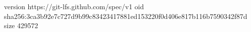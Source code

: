version https://git-lfs.github.com/spec/v1
oid sha256:3ca3b92e7c727d9b99c83423417881ed153220f0d406e817b116b7590342f87d
size 429572
